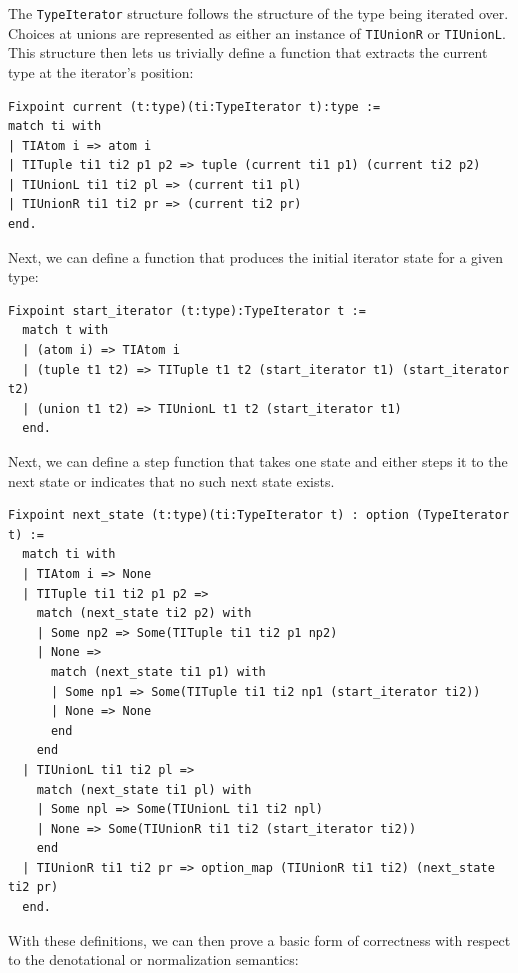 \documentclass[a4paper,english]{lipics-v2019}
\begin{document}
The \verb|TypeIterator| structure follows the structure of the type being
iterated over. Choices at unions are represented as either an instance of
\verb|TIUnionR| or \verb|TIUnionL|. This structure then lets us trivially
define a function that extracts the current type at the iterator's position:

\begin{small}\begin{verbatim}
Fixpoint current (t:type)(ti:TypeIterator t):type :=
match ti with
| TIAtom i => atom i
| TITuple ti1 ti2 p1 p2 => tuple (current ti1 p1) (current ti2 p2)
| TIUnionL ti1 ti2 pl => (current ti1 pl)
| TIUnionR ti1 ti2 pr => (current ti2 pr)
end.
\end{verbatim}
\end{small}

\noindent Next, we can define a function that produces the initial iterator state for a
given type:

\begin{small}
\begin{verbatim}
Fixpoint start_iterator (t:type):TypeIterator t :=
  match t with
  | (atom i) => TIAtom i
  | (tuple t1 t2) => TITuple t1 t2 (start_iterator t1) (start_iterator t2)
  | (union t1 t2) => TIUnionL t1 t2 (start_iterator t1)
  end.
\end{verbatim}
\end{small}

\noindent Next, we can define a step function that takes one state and either steps it
to the next state or indicates that no such next state exists.

\begin{small}\begin{verbatim}
Fixpoint next_state (t:type)(ti:TypeIterator t) : option (TypeIterator t) :=
  match ti with
  | TIAtom i => None
  | TITuple ti1 ti2 p1 p2 =>
    match (next_state ti2 p2) with
    | Some np2 => Some(TITuple ti1 ti2 p1 np2)
    | None =>
      match (next_state ti1 p1) with
      | Some np1 => Some(TITuple ti1 ti2 np1 (start_iterator ti2))
      | None => None
      end
    end
  | TIUnionL ti1 ti2 pl =>
    match (next_state ti1 pl) with
    | Some npl => Some(TIUnionL ti1 ti2 npl)
    | None => Some(TIUnionR ti1 ti2 (start_iterator ti2))
    end
  | TIUnionR ti1 ti2 pr => option_map (TIUnionR ti1 ti2) (next_state ti2 pr)
  end.
\end{verbatim}\end{small}

With these definitions, we can then prove a basic form of correctness with
respect to the denotational or normalization semantics:
\end{document}
